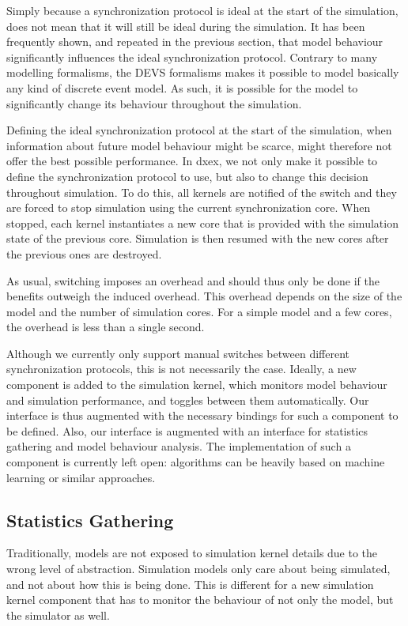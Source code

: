 Simply because a synchronization protocol is ideal at the start of the simulation, does not mean that it will still be ideal during the simulation.
It has been frequently shown, and repeated in the previous section, that model behaviour significantly influences the ideal synchronization protocol.
Contrary to many modelling formalisms, the DEVS formalisms makes it possible to model basically any kind of discrete event model.
As such, it is possible for the model to significantly change its behaviour throughout the simulation.

Defining the ideal synchronization protocol at the start of the simulation, when information about future model behaviour might be scarce, might therefore not offer the best possible performance.
In dxex, we not only make it possible to define the synchronization protocol to use, but also to change this decision throughout simulation.
To do this, all kernels are notified of the switch and they are forced to stop simulation using the current synchronization core.
When stopped, each kernel instantiates a new core that is provided with the simulation state of the previous core.
Simulation is then resumed with the new cores after the previous ones are destroyed.

As usual, switching imposes an overhead and should thus only be done if the benefits outweigh the induced overhead.
This overhead depends on the size of the model and the number of simulation cores.
For a simple model and a few cores, the overhead is less than a single second.

Although we currently only support manual switches between different synchronization protocols, this is not necessarily the case.
Ideally, a new component is added to the simulation kernel, which monitors model behaviour and simulation performance, and toggles between them automatically.
Our interface is thus augmented with the necessary bindings for such a component to be defined.
Also, our interface is augmented with an interface for statistics gathering and model behaviour analysis.
The implementation of such a component is currently left open: algorithms can be heavily based on machine learning or similar approaches.

\subsection{Statistics Gathering}
Traditionally, models are not exposed to simulation kernel details due to the wrong level of abstraction.
Simulation models only care about being simulated, and not about how this is being done.
This is different for a new simulation kernel component that has to monitor the behaviour of not only the model, but the simulator as well.

